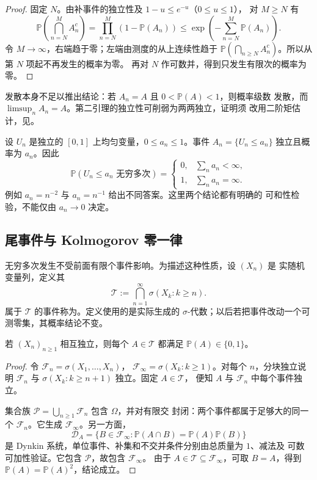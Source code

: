 \begin{proof}
固定 $N$。由补事件的独立性及 $1-u\le e^{-u}$（$0\le u\le1$），
对 $M\ge N$ 有
\[
 \mathbb P\left(\bigcap_{n=N}^MA_n^c\right)
 =\prod_{n=N}^M(1-\mathbb P(A_n))
 \le\exp\left(-\sum_{n=N}^M\mathbb P(A_n)\right).
\]
令 $M\to\infty$，右端趋于零；左端由测度的从上连续性趋于
$\mathbb P(\bigcap_{n\ge N}A_n^c)$。所以从第 $N$ 项起不再发生的概率为零。
再对 $N$ 作可数并，得到只发生有限次的概率为零。
\end{proof}

发散本身不足以推出结论：若 $A_n=A$ 且 $0<\mathbb P(A)<1$，则概率级数
发散，而 $\limsup_nA_n=A$。第二引理的独立性可削弱为两两独立，证明须
改用二阶矩估计，见。

\begin{example}[阈值事件]
设 $U_n$ 是独立的 $[0,1]$ 上均匀变量，$0\le a_n\le1$。事件
$A_n=\{U_n\le a_n\}$ 独立且概率为 $a_n$。因此
\[
 \mathbb P(U_n\le a_n\text{ 无穷多次})
 =\begin{cases}0,&\sum_na_n<\infty,\\1,&\sum_na_n=\infty.\end{cases}
\]
例如 $a_n=n^{-2}$ 与 $a_n=n^{-1}$ 给出不同答案。这里两个结论都有明确的
可和性检验，不能仅由 $a_n\to0$ 决定。
\end{example}

\subsection{尾事件与 Kolmogorov 零一律}

无穷多次发生不受前面有限个事件影响。为描述这种性质，设 $(X_n)$ 是
实随机变量列，定义其
\[
 \mathcal T:=\bigcap_{n=1}^{\infty}\sigma(X_k:k\ge n).
\]
属于 $\mathcal T$ 的事件称为。定义使用的是实际生成的
$\sigma$-代数；以后若把事件改动一个可测零集，其概率结论不变。

\begin{theorem}
\label{thm:kolmogorov-tail-zero-one}
若 $(X_n)_{n\ge1}$ 相互独立，则每个 $A\in\mathcal T$ 都满足
$\mathbb P(A)\in\{0,1\}$。
\end{theorem}

\begin{proof}
令 $\mathcal F_n=\sigma(X_1,\ldots,X_n)$，
$\mathcal F_\infty=\sigma(X_k:k\ge1)$。对每个 $n$，分块独立说明
$\mathcal F_n$ 与 $\sigma(X_k:k\ge n+1)$ 独立。固定 $A\in\mathcal T$，
便知 $A$ 与 $\mathcal F_n$ 中每个事件独立。

集合族 $\mathcal P=\bigcup_{n\ge1}\mathcal F_n$ 包含 $\Omega$，并对有限交
封闭：两个事件都属于足够大的同一个 $\mathcal F_n$。它生成
$\mathcal F_\infty$。另一方面，
\[
 \mathcal D_A=\{B\in\mathcal F_\infty:
    \mathbb P(A\cap B)=\mathbb P(A)\mathbb P(B)\}
\]
是 Dynkin 系统，单位事件、补集和不交并条件分别由总质量为 $1$、减法及
可数可加性验证。它包含 $\mathcal P$，故包含 $\mathcal F_\infty$。
由于 $A\in\mathcal T\subseteq\mathcal F_\infty$，可取 $B=A$，得到
$\mathbb P(A)=\mathbb P(A)^2$，结论成立。
\end{proof}

